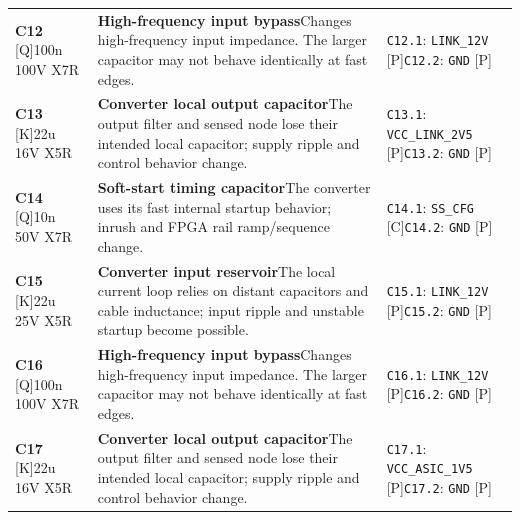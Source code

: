 \documentclass[11pt,a4paper]{article}
\begin{document}
\begin{longtable}{@{}P{27mm}P{77mm}P{62mm}@{}}
\textbf{C12} [Q]\newline 100n 100V X7R & \textbf{High-frequency input bypass}\newline Changes high-frequency input impedance. The larger capacitor may not behave identically at fast edges. & \nolinkurl{C12.1}: \nolinkurl{LINK_12V} [P]\newline \nolinkurl{C12.2}: \nolinkurl{GND} [P] \\
\textbf{C13} [K]\newline 22u 16V X5R & \textbf{Converter local output capacitor}\newline The output filter and sensed node lose their intended local capacitor; supply ripple and control behavior change. & \nolinkurl{C13.1}: \nolinkurl{VCC_LINK_2V5} [P]\newline \nolinkurl{C13.2}: \nolinkurl{GND} [P] \\
\textbf{C14} [Q]\newline 10n 50V X7R & \textbf{Soft-start timing capacitor}\newline The converter uses its fast internal startup behavior; inrush and FPGA rail ramp/sequence change. & \nolinkurl{C14.1}: \nolinkurl{SS_CFG} [C]\newline \nolinkurl{C14.2}: \nolinkurl{GND} [P] \\
\textbf{C15} [K]\newline 22u 25V X5R & \textbf{Converter input reservoir}\newline The local current loop relies on distant capacitors and cable inductance; input ripple and unstable startup become possible. & \nolinkurl{C15.1}: \nolinkurl{LINK_12V} [P]\newline \nolinkurl{C15.2}: \nolinkurl{GND} [P] \\
\textbf{C16} [Q]\newline 100n 100V X7R & \textbf{High-frequency input bypass}\newline Changes high-frequency input impedance. The larger capacitor may not behave identically at fast edges. & \nolinkurl{C16.1}: \nolinkurl{LINK_12V} [P]\newline \nolinkurl{C16.2}: \nolinkurl{GND} [P] \\
\textbf{C17} [K]\newline 22u 16V X5R & \textbf{Converter local output capacitor}\newline The output filter and sensed node lose their intended local capacitor; supply ripple and control behavior change. & \nolinkurl{C17.1}: \nolinkurl{VCC_ASIC_1V5} [P]\newline \nolinkurl{C17.2}: \nolinkurl{GND} [P] \\

\end{longtable}
\end{document}
